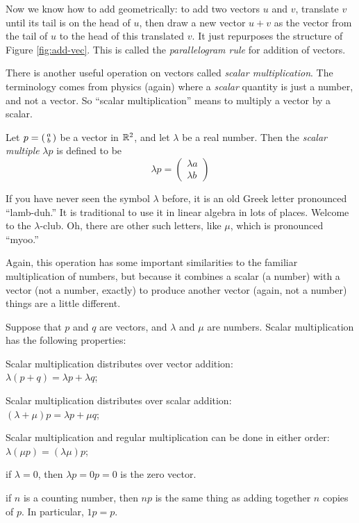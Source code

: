 \documentclass[elementsmain.tex]{subfiles}
\begin{document}
Now we know how to add geometrically: to add two vectors $u$ and $v$, translate $v$ until its tail is on the head of $u$, then draw a new vector $u+v$ as the vector from the tail of $u$ to the head of this translated $v$. It just repurposes the structure of Figure \ref{fig:add-vec}. This is called the \emph{parallelogram rule} for addition of vectors.

There is another useful operation on vectors called \emph{scalar multiplication}.
The terminology comes from physics (again) where a \emph{scalar} quantity is just a number, and not a vector.
So ``scalar multiplication'' means to multiply a vector by a scalar.


\begin{definition}
Let $p = \left(\begin{smallmatrix} a \\ b \end{smallmatrix}\right)$ be a vector in $\mathbb{R}^2$, and let $\lambda$ be a real number. Then the \emph{scalar multiple} $\lambda p$ is defined to be
\[
\lambda p = \begin{pmatrix} \lambda a \\ \lambda b \end{pmatrix}
\]
\end{definition}

If you have never seen the symbol $\lambda$ before, it is an old Greek letter pronounced ``lamb-duh.'' It is traditional to use it in linear algebra in lots of places. Welcome to the $\lambda$-club. Oh, there are other such letters, like $\mu$, which is pronounced ``myoo.''

Again, this operation has some important similarities to the familiar multiplication of numbers, but because it combines a scalar (a number) with a vector (not a number, exactly) to produce another vector (again, not a number) things are a little different.

\begin{theorem}\label{thm:scalar-mult}
Suppose that $p$ and $q$ are vectors, and $\lambda$ and $\mu$ are numbers. Scalar multiplication has the following properties:
\begin{compactitem}
\item Scalar multiplication distributes over vector addition:\\ $\lambda(p+q) = \lambda p + \lambda q$;
\item Scalar multiplication distributes over scalar addition:\\ $(\lambda + \mu)p = \lambda p + \mu q$;
\item Scalar multiplication and regular multiplication can be done in either order: $\lambda(\mu p) = (\lambda\mu) p$;
\item if $\lambda = 0$, then $\lambda p = 0 p = 0$ is the zero vector.
\item if $n$ is a counting number, then $np$ is the same thing as adding together $n$ copies of $p$. In particular, $1p = p$.
\end{compactitem}
\end{theorem}
\end{document}

